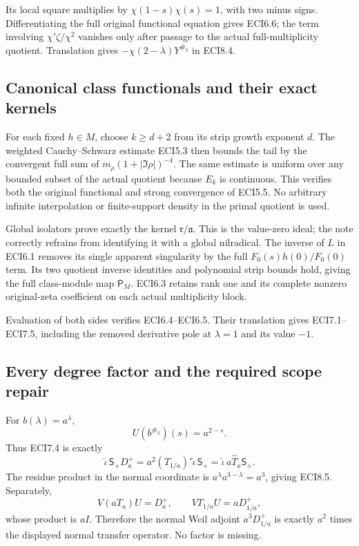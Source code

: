 Its local square multiplies by \(\chi(1-s)\chi(s)=1\), with two minus
signs. Differentiating the full original functional equation gives
ECI6.6; the term involving \(\chi'\zeta/\chi^2\) vanishes only after
passage to the actual full-multiplicity quotient. Translation gives
\(-\chi(2-\lambda)Y^{\#_3}\) in ECI8.4.

\subsection{Canonical class functionals and their exact
kernels}\label{canonical-class-functionals-and-their-exact-kernels}

For each fixed \(h\in M\), choose \(k\ge d+2\) from its strip growth
exponent \(d\). The weighted Cauchy--Schwarz estimate ECI5.3 then bounds
the tail by the convergent full sum of \(m_\rho(1+|\Im\rho|)^{-4}\). The
same estimate is uniform over any bounded subset of the actual quotient
because \(E_k\) is continuous. This verifies both the original
functional and strong convergence of ECI5.5. No arbitrary infinite
interpolation or finite-support density in the primal quotient is used.

Global isolators prove exactly the kernel \(\mathfrak r/\mathfrak a\).
This is the value-zero ideal; the note correctly refrains from
identifying it with a global nilradical. The inverse of \(L\) in ECI6.1
removes its single apparent singularity by the full
\(F_0(s)h(0)/F_0(0)\) term. Its two quotient inverse identities and
polynomial strip bounds hold, giving the full class-module map
\(\mathsf P_M\). ECI6.3 retains rank one and its complete nonzero
original-zeta coefficient on each actual multiplicity block.

Evaluation of both sides verifies ECI6.4--ECI6.5. Their translation
gives ECI7.1--ECI7.5, including the removed derivative pole at
\(\lambda=1\) and its value \(-1\).

\subsection{Every degree factor and the required scope
repair}\label{every-degree-factor-and-the-required-scope-repair}

For \(b(\lambda)=a^\lambda\), \[
U(b^{\#_3})(s)=a^{2-s}.
\] Thus ECI7.4 is exactly \[
\widehat\iota\,\mathsf S_+D_a^+
=a^2(T_{1/a})'\widehat\iota\,\mathsf S_+
=\widehat\iota\,a\widehat T_a\mathsf S_+.
\] The residue product in the normal coordinate is
\(a^\lambda a^{3-\lambda}=a^3\), giving ECI8.5. Separately, \[
V(aT_a)U=D_a^+,\qquad
VT_{1/a}U=aD_{1/a}^+,
\] whose product is \(aI\). Therefore the normal Weil adjoint
\(a^3D_{1/a}^+\) is exactly \(a^2\) times the displayed normal transfer
operator. No factor is missing.

